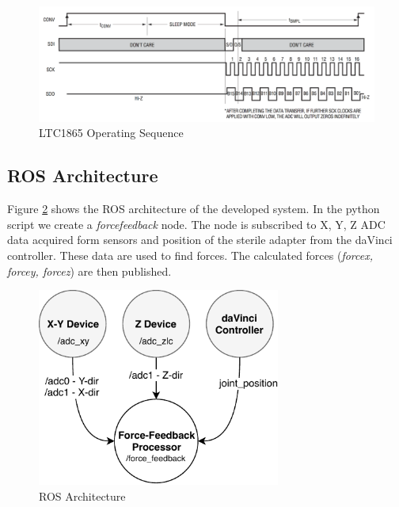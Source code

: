 \begin{figure}[h]
	\begin{center}
		\includegraphics[width=140mm]{fig/methods/SPI_communication.png}
	\end{center}
	\vspace{-4mm}
	\caption[ADC LTC1865 Operating Sequence]
	{LTC1865 Operating Sequence \cite{ltc1865}}
	\label{fig:SPI_com}
	\vspace{-2mm}
\end{figure}

	\subsection{ROS Architecture}
	\label{sec:p2}
Figure \ref{fig:ROS_arch} shows the ROS architecture of the developed system. In the python script we create a \textit{force\textunderscore feedback} node. The node is subscribed to X, Y, Z ADC data acquired form sensors and position of the sterile adapter from the daVinci controller. These data are used to find forces. The calculated forces (\textit{force\textunderscore x, force\textunderscore y, force\textunderscore z}) are then published.

\begin{figure}[h]
	\begin{center}
		\includegraphics[width=80mm]{fig/methods/ROS_architecture.pdf}
	\end{center}
	\vspace{-4mm}
	\caption[ROS Architecture]
	{ROS Architecture}
	\label{fig:ROS_arch}
	\vspace{-2mm}
\end{figure}	

